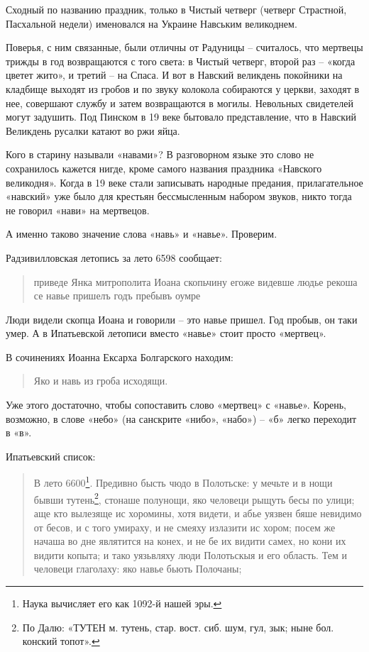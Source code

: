 Сходный по названию праздник, только в Чистый четверг (четверг Страстной, Пасхальной недели) именовался на Украине Навським великоднем.

Поверья, с ним связанные, были отличны от Радуницы – считалось, что мертвецы трижды в год возвращаются с того света: в Чистый четверг, второй раз – «когда цветет жито», и третий – на Спаса. И вот в Навский великдень покойники на кладбище выходят из гробов и по звуку колокола собираются у церкви, заходят в нее, совершают службу и затем возвращаются в могилы. Невольных свидетелей могут задушить. Под Пинском в 19 веке бытовало представление, что в Навский Великдень русалки катают во ржи яйца.

Кого в старину называли «навами»? В разговорном языке это слово не сохранилось кажется нигде, кроме самого названия праздника «Навского великодня». Когда в 19 веке стали записывать народные предания, прилагательное «навский» уже было для крестьян бессмысленным набором звуков, никто тогда не говорил «нави» на мертвецов.

А именно таково значение слова «навь» и «навье». Проверим.

Радзивилловская летопись за лето 6598 сообщает: 

\begin{quotation}
приведе Янка митрополита Иоана скопьчину егоже видевше людье рекоша се навье пришелъ годъ пребывъ оумре
\end{quotation}

Люди видели скопца Иоана и говорили – это навье пришел. Год пробыв, он таки умер. А в Ипатьевской летописи вместо «навье» стоит просто «мертвец».

В сочинениях Иоанна Ексарха Болгарского находим:

\begin{quotation}
Яко и навь из гроба исходящи.
\end{quotation}

Уже этого достаточно, чтобы сопоставить слово «мертвец» с «навье». Корень, возможно, в слове «небо» (на санскрите «нибо», «набо») – «б» легко переходит в «в».

Ипатьевский список:

\begin{quotation}
В лето 6600\footnote{Наука вычисляет его как 1092-й нашей эры.}. Предивно бысть чюдо в Полотьске: у мечьте и в нощи бывши тутень\footnote{По Далю: «ТУТЕН м. тутень, стар. вост. сиб. шум, гул, зык; ныне бол. конский топот».}, стонаше полунощи, яко человеци рыщуть бесы по улици; аще кто вылезяще ис хоромины, хотя видети, и абье уязвен бяше невидимо от бесов, и с того умираху, и не смеяху излазити ис хором; посем же начаша во дне являтится на конех, и не бе их видити самех, но кони их видити копыта; и тако уязьвляху люди Полотьскыя и его область. Тем и человеци глаголаху: яко навье бьють Полочаны;
\end{quotation}

